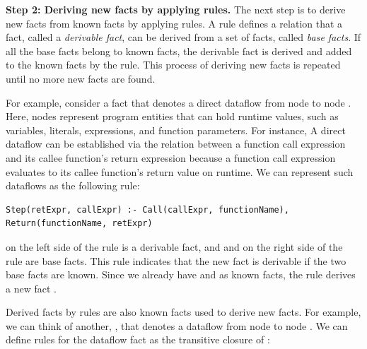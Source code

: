 \smallskip
\textbf{Step 2: Deriving new facts by applying rules.}
The next step is to derive new facts from known facts by applying rules.  A
rule defines a relation that a fact, called a {\it derivable fact}, can be
derived from a set of facts, called {\it base facts}.  If all the base facts
belong to known facts, the derivable fact is derived and added to the known
facts by the rule.  This process of deriving new facts is repeated until no
more new facts are found.


For example, consider a fact  that denotes a direct dataflow
from node  to node .  Here, nodes represent
program entities that can hold runtime values, such as variables, literals,
expressions, and function parameters.  For instance, 
%
A direct dataflow can be established via the relation between a function call
expression and its callee function's return expression because a function call
expression evaluates to its callee function's return value on runtime.  We can
represent such dataflows as the following rule:
\begin{lstlisting}[style=mrule]
Step(retExpr, callExpr) :- Call(callExpr, functionName), Return(functionName, retExpr)
\end{lstlisting}

\noindent
{} on the left side of the rule is a derivable
fact, and  and  on the right side of the rule are base facts.  This rule indicates
that the new fact  is derivable if the two base
facts are known.  Since we already have  and  as known facts, the rule derives a new fact . 

Derived facts by rules are also known facts used to derive new facts.  For
example, we can think of another, , that denotes a dataflow
from node  to node .  We can define rules for the dataflow
fact as the transitive closure of :

